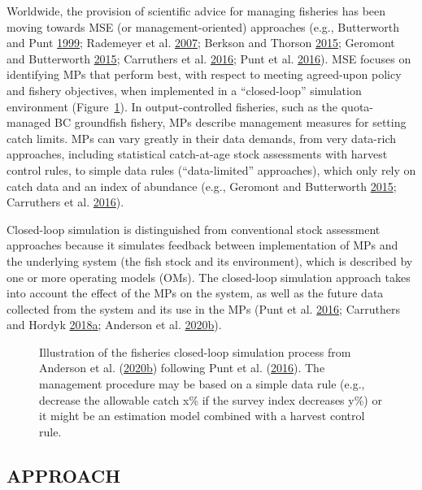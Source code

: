 \documentclass[11pt]{book}
\begin{document}
Worldwide, the provision of scientific advice for managing fisheries has been moving towards MSE (or management-oriented) approaches (e.g., Butterworth and Punt \protect\hyperlink{ref-butterworth1999}{1999}; Rademeyer et al. \protect\hyperlink{ref-rademeyer2007}{2007}; Berkson and Thorson \protect\hyperlink{ref-berkson2015}{2015}; Geromont and Butterworth \protect\hyperlink{ref-geromont2015}{2015}; Carruthers et al. \protect\hyperlink{ref-carruthers2016}{2016}; Punt et al. \protect\hyperlink{ref-punt2016}{2016}). MSE focuses on identifying MPs that perform best, with respect to meeting agreed-upon policy and fishery objectives, when implemented in a ``closed-loop'' simulation environment (Figure~\ref{fig:mse-chart-basic}). In output-controlled fisheries, such as the quota-managed BC groundfish fishery, MPs describe management measures for setting catch limits. MPs can vary greatly in their data demands, from very data-rich approaches, including statistical catch-at-age stock assessments with harvest control rules, to simple data rules (``data-limited'' approaches), which only rely on catch data and an index of abundance (e.g., Geromont and Butterworth \protect\hyperlink{ref-geromont2015}{2015}; Carruthers et al. \protect\hyperlink{ref-carruthers2016}{2016}).

Closed-loop simulation is distinguished from conventional stock assessment approaches because it simulates feedback between implementation of MPs and the underlying system (the fish stock and its environment), which is described by one or more operating models (OMs). The closed-loop simulation approach takes into account the effect of the MPs on the system, as well as the future data collected from the system and its use in the MPs (Punt et al. \protect\hyperlink{ref-punt2016}{2016}; Carruthers and Hordyk \protect\hyperlink{ref-carruthers2018}{2018}\protect\hyperlink{ref-carruthers2018}{a}; Anderson et al. \protect\hyperlink{ref-anderson2020gfmp}{2020}\protect\hyperlink{ref-anderson2020gfmp}{b}).


\begin{figure}[htb]

{\centering {} 

}

\caption{Illustration of the fisheries closed-loop simulation process from Anderson et al. (\protect\hyperlink{ref-anderson2020gfmp}{2020}\protect\hyperlink{ref-anderson2020gfmp}{b}) following Punt et al. (\protect\hyperlink{ref-punt2016}{2016}). The management procedure may be based on a simple data rule (e.g., decrease the allowable catch x\% if the survey index decreases y\%) or it might be an estimation model combined with a harvest control rule.}\label{fig:mse-chart-basic}
\end{figure}
\hypertarget{sec:introduction-approach}{%
\subsection{APPROACH}\label{sec:introduction-approach}}
\end{document}
